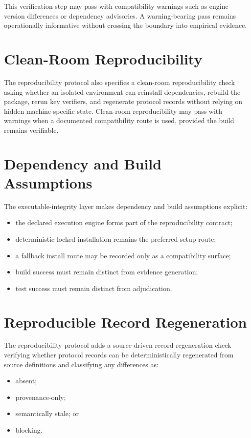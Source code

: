 \documentclass[11pt,a4paper]{article}
\begin{document}
This verification step may pass with compatibility warnings such as engine
version differences or dependency advisories. A warning-bearing pass remains
operationally informative without crossing the boundary into empirical evidence.

\section{Clean-Room Reproducibility}

The reproducibility protocol also specifies a clean-room reproducibility check asking whether an
isolated environment can reinstall dependencies, rebuild the package, rerun
key verifiers, and regenerate protocol records without relying on hidden
machine-specific state. Clean-room reproducibility may pass with warnings when a
documented compatibility route is used, provided the build remains verifiable.

\section{Dependency and Build Assumptions}

The executable-integrity layer makes dependency and build assumptions explicit:

\begin{itemize}
\item the declared execution engine forms part of the reproducibility contract;
\item deterministic locked installation remains the preferred setup route;
\item a fallback install route may be recorded only as a compatibility surface;
\item build success must remain distinct from evidence generation;
\item test success must remain distinct from adjudication.
\end{itemize}

\section{Reproducible Record Regeneration}

The reproducibility protocol adds a source-driven record-regeneration check verifying whether
protocol records can be deterministically regenerated from source definitions
and classifying any differences as:

\begin{itemize}
\item absent;
\item provenance-only;
\item semantically stale; or
\item blocking.
\end{itemize}
\end{document}
